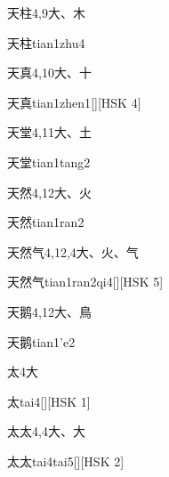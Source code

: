 \begin{entry}{天柱}{4,9}{⼤、⽊}
  \begin{phonetics}{天柱}{tian1zhu4}
  \end{phonetics}
\end{entry}

\begin{entry}{天真}{4,10}{⼤、⼗}
  \begin{phonetics}{天真}{tian1zhen1}[][HSK 4]
  \end{phonetics}
\end{entry}

\begin{entry}{天堂}{4,11}{⼤、⼟}
  \begin{phonetics}{天堂}{tian1tang2}
  \end{phonetics}
\end{entry}

\begin{entry}{天然}{4,12}{⼤、⽕}
  \begin{phonetics}{天然}{tian1ran2}
  \end{phonetics}
\end{entry}

\begin{entry}{天然气}{4,12,4}{⼤、⽕、⽓}
  \begin{phonetics}{天然气}{tian1ran2qi4}[][HSK 5]
  \end{phonetics}
\end{entry}

\begin{entry}{天鹅}{4,12}{⼤、⿃}
  \begin{phonetics}{天鹅}{tian1'e2}
  \end{phonetics}
\end{entry}

\begin{entry}{太}{4}{⼤}
  \begin{phonetics}{太}{tai4}[][HSK 1]
  \end{phonetics}
\end{entry}

\begin{entry}{太太}{4,4}{⼤、⼤}
  \begin{phonetics}{太太}{tai4tai5}[][HSK 2]
  \end{phonetics}
\end{entry}

